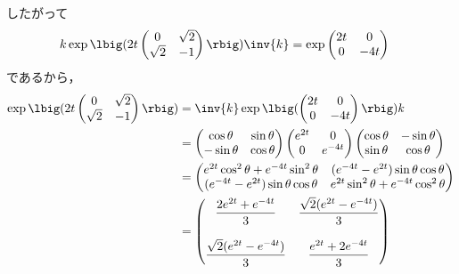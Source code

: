 \begin{npfwn}
  したがって
  \begin{align*}
    k\exp\lbig(2t\begin{pmatrix}
      0 & \sqrt{2} \\
      \sqrt{2} & -1 
    \end{pmatrix}\rbig)\inv{k} &= \exp
                                 \begin{pmatrix}
                                   2t & 0 \\ 0 & -4t
                                 \end{pmatrix}
  \end{align*}
  であるから，
  \begin{align*}
    \exp\lbig(2t\begin{pmatrix}
      0 & \sqrt{2} \\
      \sqrt{2} & -1 
    \end{pmatrix}\rbig) &= \inv{k} \exp\lbig(
                                 \begin{pmatrix}
                                   2t & 0 \\ 0 & -4t
                                 \end{pmatrix}\rbig)k\\
        &=
          \begin{pmatrix}
            \cos \theta  & \sin \theta \\ -\sin \theta & \cos \theta
          \end{pmatrix}
                                                         \begin{pmatrix}
                                                           e^{2t} & 0 \\ 0 & e^{-4t}
                                                         \end{pmatrix}
                                                                             \begin{pmatrix}
                                                                               \cos \theta  & -\sin \theta \\ \sin \theta & \cos \theta
                                                                             \end{pmatrix}\\
        &=
          \begin{pmatrix}
            e^{2t}\cos^2\theta + e^{-4t}\sin^2 \theta  & (e^{-4t} - e^{2t})\sin\theta \cos\theta \\ (e^{-4t} - e^{2t})\sin\theta \cos\theta  & e^{2t}\sin^2\theta +e^{-4t}\cos^2\theta
          \end{pmatrix}\\
        &= \begin{pmatrix}
          \dfrac{2e^{2t} + e^{-4t}}{3} &  \dfrac{\sqrt{2} (e^{2t} - e^{-4t})}{3}\\
          \\
          \dfrac{\sqrt{2} (e^{2t} - e^{-4t})}{3} & \dfrac{e^{2t} + 2e^{-4t}}{3}
                 \end{pmatrix}
  \end{align*}
\end{npfwn}

